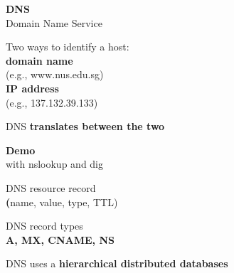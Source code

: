 \begin{frame}\begin{center}\Huge
\textbf{DNS}\\
\large{Domain Name Service}
\end{center}\end{frame}

\begin{frame}\begin{center}\large
Two ways to identify a host:\\[10pt]
\textbf{domain name}\\
(e.g., www.nus.edu.sg)\\[10pt]
\textbf{IP address}\\
(e.g., 137.132.39.133)
\end{center}\end{frame}

\begin{frame}\begin{center}\large
	DNS \textbf{translates between the two}
\end{center}\end{frame}

\begin{frame}\begin{center}\large
\textbf{Demo}\\ with nslookup and dig
\end{center}\end{frame}

\begin{frame}\begin{center}\large
DNS resource record\\
\textbf(name, value, type, TTL)
\end{center}\end{frame}

\begin{frame}\begin{center}\large
DNS record types\\
\textbf{A, MX, CNAME, NS}
\end{center}\end{frame}

\begin{frame}\begin{center}\large
DNS uses a \textbf{hierarchical distributed databases}
\end{center}\end{frame}

